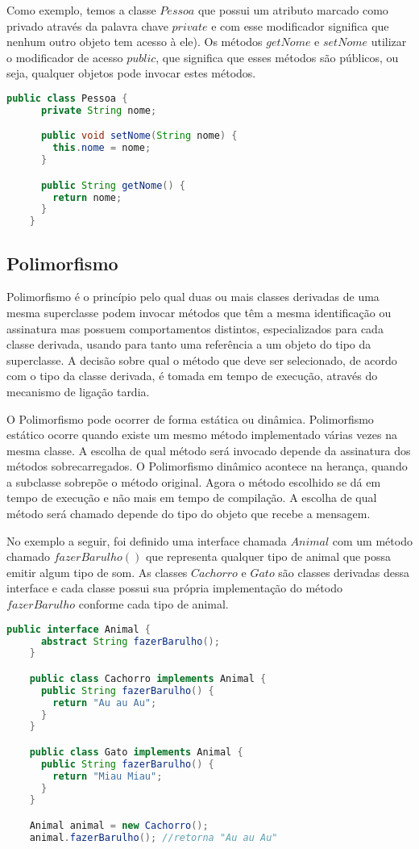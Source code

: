    Como exemplo, temos a classe $Pessoa$ que possui um atributo marcado como privado através da palavra chave $private$ e com esse modificador significa que nenhum outro objeto tem acesso à ele). Os métodos $getNome$ e $setNome$ utilizar o modificador de acesso $public$, que significa que esses métodos são públicos, ou seja, qualquer objetos pode invocar estes métodos.

    \begin{lstlisting}[language=Java, mathescape=false]
    public class Pessoa {
      private String nome;

      public void setNome(String nome) {
        this.nome = nome;
      }

      public String getNome() {
        return nome;
      }
    }
    \end{lstlisting}

    \subsection{Polimorfismo}

    Polimorfismo é o princípio pelo qual duas ou mais classes derivadas de uma mesma superclasse podem invocar métodos que têm a mesma identificação ou assinatura mas possuem comportamentos distintos, especializados para cada classe derivada, usando para tanto uma referência a um objeto do tipo da superclasse. A decisão sobre qual o método que deve ser selecionado, de acordo com o tipo da classe derivada, é tomada em tempo de execução, através do mecanismo de ligação tardia.\cite{JavaPolimorf}

    O Polimorfismo pode ocorrer de forma estática ou dinâmica. Polimorfismo estático ocorre quando existe um mesmo método implementado várias vezes na mesma classe. A escolha de qual método será invocado depende da assinatura dos métodos sobrecarregados. O Polimorfismo dinâmico acontece na herança, quando a subclasse sobrepõe o método original. Agora o método escolhido se dá em tempo de execução e não mais em tempo de compilação. A escolha de qual método será chamado depende do tipo do objeto que recebe a mensagem.

    No exemplo a seguir, foi definido uma interface chamada $Animal$ com um método chamado $fazerBarulho()$ que representa qualquer tipo de animal que possa emitir algum tipo de som. As classes $Cachorro$ e $Gato$ são classes derivadas dessa interface e cada classe possui sua própria implementação do método $fazerBarulho$ conforme cada tipo de animal.

    \begin{lstlisting}[language=Java, mathescape=false]
    public interface Animal {
      abstract String fazerBarulho();
    }

    public class Cachorro implements Animal {
      public String fazerBarulho() {
        return "Au au Au";
      }
    }

    public class Gato implements Animal {
      public String fazerBarulho() {
        return "Miau Miau";
      }
    }

    Animal animal = new Cachorro();
    animal.fazerBarulho(); //retorna "Au au Au"
    \end{lstlisting}
